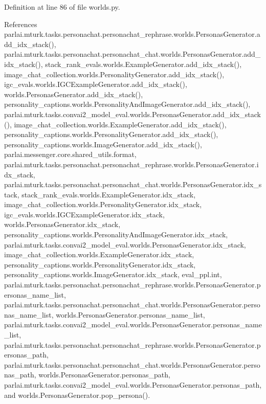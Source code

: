 Definition at line 86 of file worlds.\+py.



References parlai.\+mturk.\+tasks.\+personachat.\+personachat\+\_\+rephrase.\+worlds.\+Personas\+Generator.\+add\+\_\+idx\+\_\+stack(), parlai.\+mturk.\+tasks.\+personachat.\+personachat\+\_\+chat.\+worlds.\+Personas\+Generator.\+add\+\_\+idx\+\_\+stack(), stack\+\_\+rank\+\_\+evals.\+worlds.\+Example\+Generator.\+add\+\_\+idx\+\_\+stack(), image\+\_\+chat\+\_\+collection.\+worlds.\+Personality\+Generator.\+add\+\_\+idx\+\_\+stack(), igc\+\_\+evals.\+worlds.\+I\+G\+C\+Example\+Generator.\+add\+\_\+idx\+\_\+stack(), worlds.\+Personas\+Generator.\+add\+\_\+idx\+\_\+stack(), personality\+\_\+captions.\+worlds.\+Personality\+And\+Image\+Generator.\+add\+\_\+idx\+\_\+stack(), parlai.\+mturk.\+tasks.\+convai2\+\_\+model\+\_\+eval.\+worlds.\+Personas\+Generator.\+add\+\_\+idx\+\_\+stack(), image\+\_\+chat\+\_\+collection.\+worlds.\+Example\+Generator.\+add\+\_\+idx\+\_\+stack(), personality\+\_\+captions.\+worlds.\+Personality\+Generator.\+add\+\_\+idx\+\_\+stack(), personality\+\_\+captions.\+worlds.\+Image\+Generator.\+add\+\_\+idx\+\_\+stack(), parlai.\+messenger.\+core.\+shared\+\_\+utils.\+format, parlai.\+mturk.\+tasks.\+personachat.\+personachat\+\_\+rephrase.\+worlds.\+Personas\+Generator.\+idx\+\_\+stack, parlai.\+mturk.\+tasks.\+personachat.\+personachat\+\_\+chat.\+worlds.\+Personas\+Generator.\+idx\+\_\+stack, stack\+\_\+rank\+\_\+evals.\+worlds.\+Example\+Generator.\+idx\+\_\+stack, image\+\_\+chat\+\_\+collection.\+worlds.\+Personality\+Generator.\+idx\+\_\+stack, igc\+\_\+evals.\+worlds.\+I\+G\+C\+Example\+Generator.\+idx\+\_\+stack, worlds.\+Personas\+Generator.\+idx\+\_\+stack, personality\+\_\+captions.\+worlds.\+Personality\+And\+Image\+Generator.\+idx\+\_\+stack, parlai.\+mturk.\+tasks.\+convai2\+\_\+model\+\_\+eval.\+worlds.\+Personas\+Generator.\+idx\+\_\+stack, image\+\_\+chat\+\_\+collection.\+worlds.\+Example\+Generator.\+idx\+\_\+stack, personality\+\_\+captions.\+worlds.\+Personality\+Generator.\+idx\+\_\+stack, personality\+\_\+captions.\+worlds.\+Image\+Generator.\+idx\+\_\+stack, eval\+\_\+ppl.\+int, parlai.\+mturk.\+tasks.\+personachat.\+personachat\+\_\+rephrase.\+worlds.\+Personas\+Generator.\+personas\+\_\+name\+\_\+list, parlai.\+mturk.\+tasks.\+personachat.\+personachat\+\_\+chat.\+worlds.\+Personas\+Generator.\+personas\+\_\+name\+\_\+list, worlds.\+Personas\+Generator.\+personas\+\_\+name\+\_\+list, parlai.\+mturk.\+tasks.\+convai2\+\_\+model\+\_\+eval.\+worlds.\+Personas\+Generator.\+personas\+\_\+name\+\_\+list, parlai.\+mturk.\+tasks.\+personachat.\+personachat\+\_\+rephrase.\+worlds.\+Personas\+Generator.\+personas\+\_\+path, parlai.\+mturk.\+tasks.\+personachat.\+personachat\+\_\+chat.\+worlds.\+Personas\+Generator.\+personas\+\_\+path, worlds.\+Personas\+Generator.\+personas\+\_\+path, parlai.\+mturk.\+tasks.\+convai2\+\_\+model\+\_\+eval.\+worlds.\+Personas\+Generator.\+personas\+\_\+path, and worlds.\+Personas\+Generator.\+pop\+\_\+persona().

